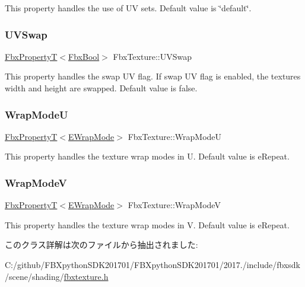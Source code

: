 This property handles the use of UV sets. Default value is \char`\"{}default\char`\"{}. \mbox{\label{class_fbx_texture_a8c14f57534caca44296248db850db26e}} 
\subsubsection{\texorpdfstring{U\+V\+Swap}{UVSwap}}
{\footnotesize\ttfamily \hyperlink{class_fbx_property_t}{Fbx\+PropertyT}$<$\hyperlink{fbxtypes_8h_a92e0562b2fe33e76a242f498b362262e}{Fbx\+Bool}$>$ Fbx\+Texture\+::\+U\+V\+Swap}

This property handles the swap UV flag. If swap UV flag is enabled, the texture\textquotesingle{}s width and height are swapped. Default value is false. \mbox{\label{class_fbx_texture_a0bc6524ab7ff1287b95ef46147660d7a}} 
\subsubsection{\texorpdfstring{Wrap\+ModeU}{WrapModeU}}
{\footnotesize\ttfamily \hyperlink{class_fbx_property_t}{Fbx\+PropertyT}$<$\hyperlink{class_fbx_texture_ae273dffe3ff532dfd57e7bdb15b121fd}{E\+Wrap\+Mode}$>$ Fbx\+Texture\+::\+Wrap\+ModeU}

This property handles the texture wrap modes in U. Default value is e\+Repeat. \mbox{\label{class_fbx_texture_ae829c86b14a0bf8168d4997f5fd729ce}} 
\subsubsection{\texorpdfstring{Wrap\+ModeV}{WrapModeV}}
{\footnotesize\ttfamily \hyperlink{class_fbx_property_t}{Fbx\+PropertyT}$<$\hyperlink{class_fbx_texture_ae273dffe3ff532dfd57e7bdb15b121fd}{E\+Wrap\+Mode}$>$ Fbx\+Texture\+::\+Wrap\+ModeV}

This property handles the texture wrap modes in V. Default value is e\+Repeat. 

このクラス詳解は次のファイルから抽出されました\+:\begin{DoxyCompactItemize}
\item 
C\+:/github/\+F\+B\+Xpython\+S\+D\+K201701/\+F\+B\+Xpython\+S\+D\+K201701/2017./include/fbxsdk/scene/shading/\hyperlink{fbxtexture_8h}{fbxtexture.\+h}\end{DoxyCompactItemize}

